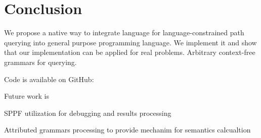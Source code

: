 \section{Conclusion}

We propose a native way to integrate language for language-constrained path querying into general purpose programming language.
We implement it and show that our implementation can be applied for real  problems.
Arbitrary context-free grammars for querying.

Code is available on GitHub: 

Future work is

SPPF utilization for debugging and results processing

Attributed grammars processing to provide mechanim for semantics calcualtion